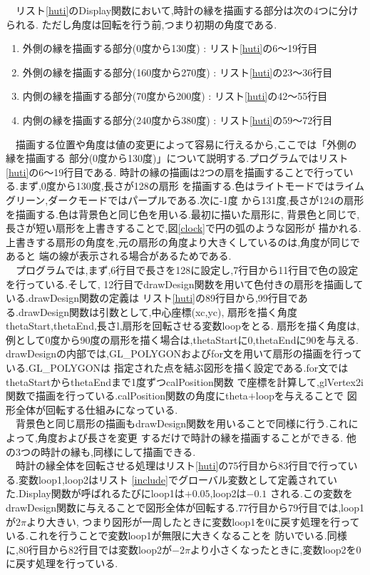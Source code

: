 \documentclass[a4j]{jarticle}
\begin{document}
    　リスト\ref{huti}のDisplay関数において,時計の縁を描画する部分は次の4つに分けられる.
    ただし角度は回転を行う前,つまり初期の角度である.
    \begin{enumerate}
      \item 外側の縁を描画する部分(0度から130度) : リスト\ref{huti}の6～19行目
      \item 外側の縁を描画する部分(160度から270度) : リスト\ref{huti}の23～36行目
      \item 内側の縁を描画する部分(70度から200度) : リスト\ref{huti}の42～55行目
      \item 内側の縁を描画する部分(240度から380度) : リスト\ref{huti}の59～72行目
    \end{enumerate}
    　描画する位置や角度は値の変更によって容易に行えるから,ここでは「外側の縁を描画する
    部分(0度から130度)」について説明する.プログラムではリスト\ref{huti}の6～19行目である.
    時計の縁の描画は2つの扇を描画することで行っている.まず,0度から130度,長さが128の扇形
    を描画する.色はライトモードではライムグリーン,ダークモードではパープルである.次に-1度
    から131度,長さが124の扇形を描画する.色は背景色と同じ色を用いる.最初に描いた扇形に,
    背景色と同じで,長さが短い扇形を上書きすることで,図\ref{clock}で円の弧のような図形が
    描かれる.上書きする扇形の角度を,元の扇形の角度より大きくしているのは,角度が同じであると
    端の線が表示される場合があるためである.\\
    　プログラムでは,まず,6行目で長さを128に設定し,7行目から11行目で色の設定を行っている.そして,
    12行目でdrawDesign関数を用いて色付きの扇形を描画している.drawDesign関数の定義は
    リスト\ref{huti}の89行目から,99行目である.drawDesign関数は引数として,中心座標(xc,yc),
    扇形を描く角度thetaStart,thetaEnd,長さl,扇形を回転させる変数loopをとる.
    扇形を描く角度は,例として0度から90度の扇形を描く場合は,thetaStartに0,thetaEndに90を与える.
    drawDesignの内部では,GL\_POLYGONおよびfor文を用いて扇形の描画を行っている.GL\_POLYGONは
    指定された点を結ぶ図形を描く設定である.for文ではthetaStartからthetaEndまで1度ずつcalPosition関数
    で座標を計算して,glVertex2i関数で描画を行っている.calPosition関数の角度にtheta$+$loopを与えることで
    図形全体が回転する仕組みになっている.\\
    　背景色と同じ扇形の描画もdrawDesign関数を用いることで同様に行う.これによって,角度および長さを変更
    するだけで時計の縁を描画することができる.
    他の3つの時計の縁も,同様にして描画できる.\\
    　時計の縁全体を回転させる処理はリスト\ref{huti}の75行目から83行目で行っている.変数loop1,loop2はリスト
    \ref{include}でグローバル変数として定義されていた.Display関数が呼ばれるたびにloop1は$+0.05$,loop2は$-0.1$
    される.この変数をdrawDesign関数に与えることで図形全体が回転する.77行目から79行目では,loop1が$2\pi$より大きい,
    つまり図形が一周したときに変数loop1を0に戻す処理を行っている.これを行うことで変数loop1が無限に大きくなることを
    防いでいる.同様に,80行目から82行目では変数loop2が$-2\pi$より小さくなったときに,変数loop2を0に戻す処理を行っている.
\end{document}
